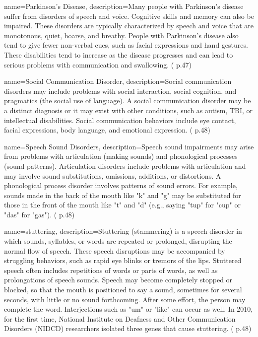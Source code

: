  {
	name={Parkinson’s Disease}, 
	description={Many people with Parkinson's disease suffer from disorders of speech and voice. Cognitive skills and memory can also be impaired. These disorders are typically characterized by speech and voice that are monotonous, quiet, hoarse, and breathy. People with Parkinson's disease also tend to give fewer non-verbal cues, such as facial expressions and hand gestures. These disabilities tend to increase as the disease progresses and can lead to serious problems with communication and swallowing. (\cite{SLPathologies} p.47)
}
}

 {
	name={Social Communication Disorder}, 
	description={Social communication disorders may include problems with social interaction, social cognition, and pragmatics (the social use of language). A social communication disorder may be a distinct diagnosis or it may exist with other conditions, such as autism, TBI, or intellectual disabilities. Social communication behaviors include eye contact, facial expressions, body language, and emotional expression. (\cite{SLPathologies} p.48)
}
}


 {
	name={Speech Sound Disorders}, 
	description={Speech sound impairments may arise from problems with articulation (making sounds) and phonological processes (sound patterns). Articulation disorders include problems with articulation and may involve sound substitutions, omissions, additions, or distortions. A phonological process disorder involves patterns of sound errors. For example, sounds made in the back of the mouth like "k" and "g" may be substituted for those in the front of the mouth like "t" and "d" (e.g., saying "tup" for "cup" or "das" for "gas"). (\cite{SLPathologies} p.48)
}
}


 {
	name={stuttering}, 
	description={Stuttering (stammering) is a speech disorder in which sounds, syllables, or words are repeated or prolonged, disrupting the normal flow of speech. These speech disruptions may be accompanied by struggling behaviors, such as rapid eye blinks or tremors of the lips. Stuttered speech often includes repetitions of words or parts of words, as well as prolongations of speech sounds. Speech may become completely stopped or blocked, so that the mouth is positioned to say a sound, sometimes for several seconds, with little or no sound forthcoming. After some effort, the person may complete the word. Interjections such as "um" or "like" can occur as well. In 2010, for the first time, National Institute on Deafness and Other Communication Disorders (NIDCD) researchers isolated three genes that cause stuttering. (\cite{SLPathologies} p.48)
}
}

